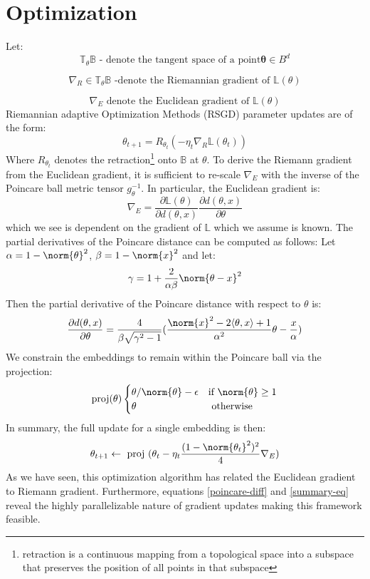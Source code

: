 \section{Optimization}
Let:
$$\mathbb{T}_\theta \mathbb{B} \text{ - denote the tangent space of a point} \mathbf{\theta} \in B^d$$ 

$$\nabla_R \in \mathbb{T}_\theta \mathbb{B} \text{ -denote the Riemannian gradient of } \mathbb{L}(\theta)$$

$$\nabla_E \text{ denote the Euclidean gradient of } \mathbb{L}(\theta)$$ 
Riemannian adaptive Optimization Methods (RSGD) parameter updates are of the form:
\begin{equation}
    \theta_{t+1} = R_{\theta_t}(-\eta_t \nabla_R \mathbb{L}(\theta_t))
\end{equation}
Where $R_{\theta_t}$ denotes the retraction\footnote[2]{retraction is a continuous mapping from a topological space into a subspace that preserves the position of all points in that subspace} onto $\mathbb{B}$ at $\theta$. To derive the Riemann gradient from the Euclidean gradient, it is sufficient to re-scale $\nabla_E$ with the inverse of the Poincare ball metric tensor $g_\theta^{-1}$. In particular, the Euclidean gradient is:
\begin{equation}
    \nabla_E = \frac{\partial \mathbb{L}(\theta)}{\partial d(\theta,x)}\frac{\partial d(\theta,x)}{\partial \theta}
\end{equation}
which we see is dependent on the gradient of $\mathbb{L}$ which we assume is known. The partial derivatives of the Poincare distance can be computed as follows: Let $\alpha = 1 - \norm{\theta}^2$, $\beta = 1-\norm{x}^2$ and let:
\begin{equation}
    \gamma = 1 + \frac{2}{\alpha \beta }\norm{\theta - x}^2
\end{equation}
Then the partial derivative of the Poincare distance with respect to $\theta$ is:
\begin{equation}
    \frac{\partial d(\theta,x)}{\partial \theta} = \frac{4}{\beta \sqrt{\gamma^2 -1}}(\frac{\norm{x}^2 -2\langle \theta , x \rangle +1}{\alpha^2}\theta - \frac{x}{\alpha}) \label{poincare-diff}
\end{equation}
We constrain the embeddings to remain within the Poincare ball via the projection:
\begin{equation}
\text{proj}(\theta)
    \begin{cases}
        \theta / \norm{\theta} - \epsilon &\text{if  }\norm{\theta} \geq 1 \\ 
        \theta & \text{  otherwise  }
    \end{cases}
\end{equation}
In summary, the full update for a single embedding is then:
\begin{equation}
    \theta_{t+1} \leftarrow \text{ proj }(\theta_t - \eta_t \frac{(1- \norm{\theta_t}^2)^2}{4}\nabla_E) \label{summary-eq} 
\end{equation}
As we have seen, this optimization algorithm has related the Euclidean gradient to Riemann gradient. Furthermore, equations \ref{poincare-diff} and \ref{summary-eq} reveal the highly parallelizable nature of gradient updates making this framework feasible.
